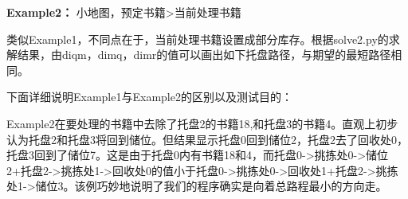 \documentclass[withoutpreface,bwprint]{thesis-config}
\begin{document}
\par \textbf{Example2：} 小地图，预定书籍>当前处理书籍
\par 类似Example1，不同点在于，当前处理书籍设置成部分库存。根据solve2.py的求解结果，由diqm，dimq，dimr的值可以画出如下托盘路径，与期望的最短路径相同。  
\par 下面详细说明Example1与Example2的区别以及测试目的：
\par Example2在要处理的书籍中去除了托盘2的书籍18,和托盘3的书籍4。直观上初步认为托盘2和托盘3将回到储位。但结果显示托盘0回到储位2，托盘2去了回收处0，托盘3回到了储位7。这是由于托盘0内有书籍18和4，而托盘0->挑拣处0->储位2+托盘2->挑拣处1->回收处0的值小于托盘0->挑拣处0->回收处1+托盘2->挑拣处1->储位3。该例巧妙地说明了我们的程序确实是向着总路程最小的方向走。


\par 
\end{document}
